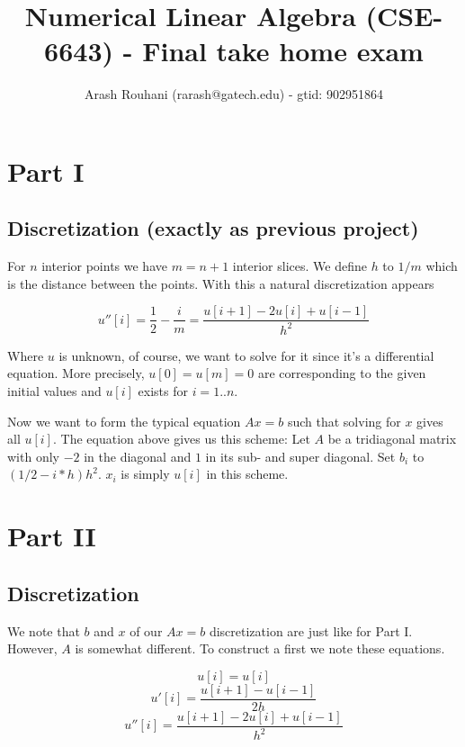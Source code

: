 \documentclass[a4paper,11pt]{article}
\title{Numerical Linear Algebra (CSE-6643) - Final take home exam}
\author{Arash Rouhani (rarash@gatech.edu) - gtid: 902951864}
\begin{document}
\maketitle

\section{Part I}


\subsection{Discretization (exactly as previous project)}

For $n$ interior points we have $m=n+1$ interior slices. We define $h$
to $1/m$ which is the distance between the points. With this a natural
discretization appears

\[
  u''[i] = \frac{1}{2} - \frac{i}{m} = \frac{u[i+1]-2u[i]+u[i-1]}{h^2}
\]

Where $u$ is unknown, of course, we want to solve for it since it's a
differential equation. More precisely, $u[0]=u[m]=0$ are corresponding
to the given initial values and $u[i]$ exists for $i = 1..n$.

Now we want to form the typical equation $Ax=b$ such that solving for
$x$ gives all $u[i]$. The equation above gives us this scheme: Let $A$
be a tridiagonal matrix with only $-2$ in the diagonal and $1$ in its
sub- and super diagonal. Set $b_i$ to $(1/2-i*h)h^2$. $x_i$ is simply
$u[i]$ in this scheme.

\section{Part II}

\subsection{Discretization}

We note that $b$ and $x$ of our $Ax=b$ discretization are just like for
Part I.  However, $A$ is somewhat different. To construct a first we
note these equations.

\[
  u[i] = u[i]
\]
\[
  u'[i] = \frac{u[i+1]-u[i-1]}{2h}
\]
\[
  u''[i] = \frac{u[i+1]-2u[i]+u[i-1]}{h^2}
\]
\end{document}
